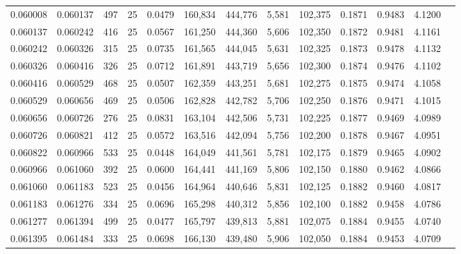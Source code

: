 \begin{tabular}{rrrrrrrrrrrrr}
0.060008 & 0.060137 &   497 &  25 &                                     0.0479 & 160,834 & 444,776 &   5,581 & 102,375 & 0.1871 & 0.9483 & 4.1200 \\
0.060137 & 0.060242 &   416 &  25 &                                     0.0567 & 161,250 & 444,360 &   5,606 & 102,350 & 0.1872 & 0.9481 & 4.1161 \\
0.060242 & 0.060326 &   315 &  25 &                                     0.0735 & 161,565 & 444,045 &   5,631 & 102,325 & 0.1873 & 0.9478 & 4.1132 \\
0.060326 & 0.060416 &   326 &  25 &                                     0.0712 & 161,891 & 443,719 &   5,656 & 102,300 & 0.1874 & 0.9476 & 4.1102 \\
0.060416 & 0.060529 &   468 &  25 &                                     0.0507 & 162,359 & 443,251 &   5,681 & 102,275 & 0.1875 & 0.9474 & 4.1058 \\
0.060529 & 0.060656 &   469 &  25 &                                     0.0506 & 162,828 & 442,782 &   5,706 & 102,250 & 0.1876 & 0.9471 & 4.1015 \\
0.060656 & 0.060726 &   276 &  25 &                                     0.0831 & 163,104 & 442,506 &   5,731 & 102,225 & 0.1877 & 0.9469 & 4.0989 \\
0.060726 & 0.060821 &   412 &  25 &                                     0.0572 & 163,516 & 442,094 &   5,756 & 102,200 & 0.1878 & 0.9467 & 4.0951 \\
0.060822 & 0.060966 &   533 &  25 &                                     0.0448 & 164,049 & 441,561 &   5,781 & 102,175 & 0.1879 & 0.9465 & 4.0902 \\
0.060966 & 0.061060 &   392 &  25 &                                     0.0600 & 164,441 & 441,169 &   5,806 & 102,150 & 0.1880 & 0.9462 & 4.0866 \\
0.061060 & 0.061183 &   523 &  25 &                                     0.0456 & 164,964 & 440,646 &   5,831 & 102,125 & 0.1882 & 0.9460 & 4.0817 \\
0.061183 & 0.061276 &   334 &  25 &                                     0.0696 & 165,298 & 440,312 &   5,856 & 102,100 & 0.1882 & 0.9458 & 4.0786 \\
0.061277 & 0.061394 &   499 &  25 &                                     0.0477 & 165,797 & 439,813 &   5,881 & 102,075 & 0.1884 & 0.9455 & 4.0740 \\
0.061395 & 0.061484 &   333 &  25 &                                     0.0698 & 166,130 & 439,480 &   5,906 & 102,050 & 0.1884 & 0.9453 & 4.0709 \\

\end{tabular}
